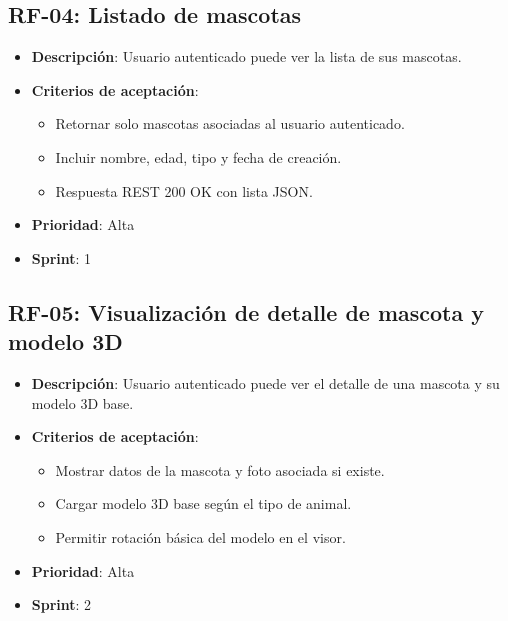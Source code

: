 \documentclass[12pt,a4paper]{article}
\begin{document}
\subsection{RF-04: Listado de mascotas}
\begin{itemize}[leftmargin=*]
    \item \textbf{Descripci\'on}: Usuario autenticado puede ver la lista de sus mascotas.
    \item \textbf{Criterios de aceptaci\'on}:
    \begin{itemize}[leftmargin=*]
        \item Retornar solo mascotas asociadas al usuario autenticado.
        \item Incluir nombre, edad, tipo y fecha de creaci\'on.
        \item Respuesta REST 200 OK con lista JSON.
    \end{itemize}
    \item \textbf{Prioridad}: Alta
    \item \textbf{Sprint}: 1
\end{itemize}

\subsection{RF-05: Visualizaci\'on de detalle de mascota y modelo 3D}
\begin{itemize}[leftmargin=*]
    \item \textbf{Descripci\'on}: Usuario autenticado puede ver el detalle de una mascota y su modelo 3D base.
    \item \textbf{Criterios de aceptaci\'on}:
    \begin{itemize}[leftmargin=*]
        \item Mostrar datos de la mascota y foto asociada si existe.
        \item Cargar modelo 3D base seg\'un el tipo de animal.
        \item Permitir rotaci\'on b\'asica del modelo en el visor.
    \end{itemize}
    \item \textbf{Prioridad}: Alta
    \item \textbf{Sprint}: 2
\end{itemize}
\end{document}

